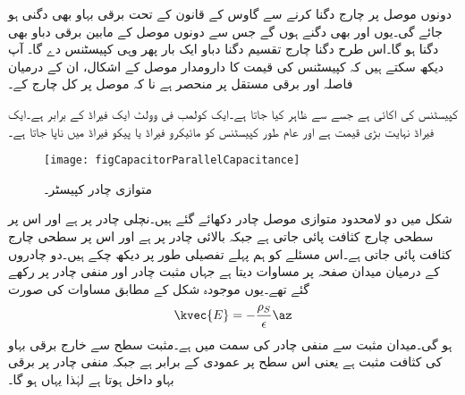 دونوں موصل پر چارج دگنا کرنے سے گاوس کے قانون کے تحت برقی بہاو بھی دگنی ہو جائے گی۔یوں  اور  بھی دگنے ہوں گے جس سے دونوں موصل کے مابین برقی دباو بھی دگنا ہو گا۔اس طرح دگنا چارج تقسیم دگنا دباو ایک بار پھر وہی کپیسٹنس دے گا۔ آپ دیکھ سکتے ہیں کہ کپیسٹنس کی قیمت کا دارومدار موصل کے اشکال، ان کے درمیان فاصلہ اور برقی مستقل پر منحصر ہے نا کہ موصل پر کل چارج کے۔

کپیسٹنس کی اکائی  ہے جسے  سے ظاہر کیا جاتا ہے۔ایک کولمب فی وولٹ ایک فیراڈ کے برابر ہے۔ایک فیراڈ نہایت بڑی قیمت ہے اور عام طور کپیسٹنس کو مائیکرو فیراڈ  یا پیکو فیراڈ  میں ناپا جاتا ہے۔

\begin{figure}
\centering
\texttt{[image: figCapacitorParallelCapacitance]}
\caption{متوازی چادر کپیسٹر۔}
\label{شکل_کپیسٹر_متوازی_چادر_کپیسٹر}
\end{figure}

شکل  میں دو لامحدود متوازی موصل چادر دکھائے گئے ہیں۔نچلی چادر   پر ہے اور اس پر سطحی چارج کثافت  پائی جاتی ہے جبکہ بالائی چادر  پر ہے اور اس پر سطحی چارج کثافت  پائی جاتی ہے۔اس مسئلے کو ہم پہلے تفصیلی طور پر دیکھ چکے ہیں۔دو چادروں کے درمیان میدان صفحہ  پر مساوات  دیتا ہے جہاں مثبت
 چادر  اور منفی چادر  پر رکھے گئے تھے۔یوں موجودہ شکل کے مطابق مساوات  کی صورت
\begin{align*}
\kvec{E}=-\frac{\rho_S}{\epsilon} \az
\end{align*}
ہو گی۔میدان مثبت سے منفی چادر کی سمت میں ہے۔مثبت سطح سے خارج برقی بہاو کی کثافت مثبت ہے یعنی اس سطح پر عمودی  کے برابر ہے جبکہ منفی چادر پر برقی بہاو داخل ہوتا ہے لہٰذا یہاں  ہو گا۔

